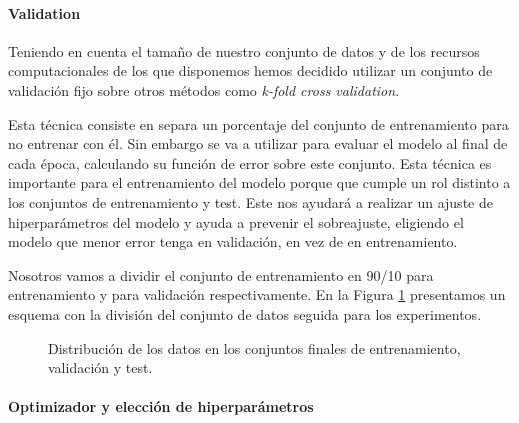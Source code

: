 \paragraph*{Validation}

Teniendo en cuenta el tamaño de nuestro conjunto de datos y de los recursos computacionales de los que disponemos hemos decidido utilizar un conjunto de validación fijo sobre otros métodos como \textit{k-fold cross validation}. 


Esta técnica consiste en separa un porcentaje del conjunto de entrenamiento para no entrenar con él. Sin embargo se va a utilizar para evaluar el modelo al final de cada época, calculando su función de error sobre este conjunto. Esta técnica es importante para el entrenamiento del modelo porque que cumple un rol distinto a los conjuntos de entrenamiento y test. Este nos ayudará a realizar un ajuste de hiperparámetros del modelo y ayuda a prevenir el sobreajuste, eligiendo el modelo que menor error tenga en validación, en vez de en entrenamiento. 

Nosotros vamos a dividir el conjunto de entrenamiento en 90/10 para entrenamiento y para validación respectivamente. En la Figura \ref{fig:distribucionTrainTestVal} presentamos un esquema con la división del conjunto de datos seguida para los experimentos.


\begin{figure}[h!]
\noindent
{}
\caption{Distribución de los datos en los conjuntos finales de entrenamiento, validación y test.}
\label{fig:distribucionTrainTestVal}
\end{figure}


\paragraph*{Optimizador y elección de hiperparámetros}

